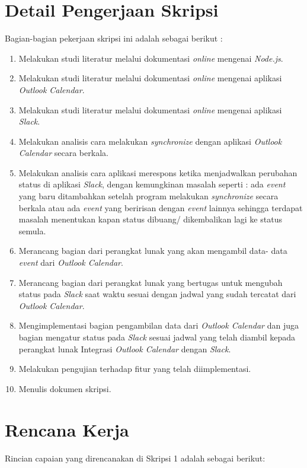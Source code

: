 \documentclass[a4paper,twoside]{article}
\begin{document}
\section{Detail Pengerjaan Skripsi}
Bagian-bagian pekerjaan skripsi ini adalah sebagai berikut :
	\begin{enumerate}
		\item Melakukan studi literatur melalui dokumentasi \textit{online} mengenai \textit{Node.js}.
		\item Melakukan studi literatur melalui dokumentasi \textit{online} mengenai aplikasi \textit{Outlook Calendar}.
		\item Melakukan studi literatur melalui dokumentasi \textit{online} mengenai aplikasi \textit{Slack}. 
		\item Melakukan analisis cara melakukan \textit{synchronize} dengan aplikasi \textit{Outlook Calendar} secara berkala.
		\item Melakukan analisis cara aplikasi merespons ketika menjadwalkan perubahan status di aplikasi \textit{Slack}, dengan kemungkinan masalah seperti : ada \textit{event} yang baru ditambahkan setelah program melakukan \textit{synchronize} secara berkala atau ada \textit{event} yang beririsan dengan \textit{event} lainnya sehingga terdapat masalah menentukan kapan status dibuang/ dikembalikan lagi ke status semula. 
		\item Merancang bagian dari perangkat lunak yang akan mengambil data- data \textit{event} dari \textit{Outlook Calendar}. 
		\item Merancang bagian dari perangkat lunak yang bertugas untuk mengubah status pada \textit{Slack} saat waktu sesuai dengan jadwal yang sudah tercatat dari \textit{Outlook Calendar}.
		\item Mengimplementasi bagian pengambilan data dari \textit{Outlook Calendar} dan juga bagian mengatur status pada \textit{Slack} sesuai jadwal yang telah diambil kepada perangkat lunak Integrasi \textit{Outlook Calendar} dengan \textit{Slack}.
		\item Melakukan pengujian terhadap fitur yang telah diimplementasi.
		\item Menulis dokumen skripsi.   
	\end{enumerate}

\section{Rencana Kerja}
Rincian capaian yang direncanakan di Skripsi 1 adalah sebagai berikut:
\end{document}
